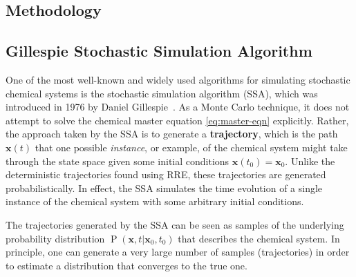 \documentclass[english,letterpaper,12pt]{report}
\newcommand{\defkeywd}[1]{\textbf{#1}}
\renewcommand{\vec}[1]{\ensuremath{\mathbf{#1}}}
\DeclareMathOperator{\Prob}{P}
\begin{document}
\begin{doublespacing}

\chapter{Methodology} %
\label{sec:methodology}

\section{Gillespie Stochastic Simulation Algorithm} %
\label{sub:gillespie-ssa}

One of the most well-known and widely used  algorithms for simulating stochastic chemical systems is the stochastic simulation algorithm (SSA), which was introduced in 1976 by Daniel Gillespie~\cite{gillespie-1976}. As a Monte Carlo technique, it does not attempt to solve the chemical master equation \eqref{eq:master-eqn} explicitly. Rather, the approach taken by the SSA is to generate a \defkeywd{trajectory}, which is the path $\vec{x}(t)$ that one possible \emph{instance}, or example, of the chemical system might take through the state space given some initial conditions $\vec{x}(t_0) = \vec{x}_0$. Unlike the deterministic trajectories found using RRE, these trajectories are generated probabilistically. In effect, the SSA simulates the time evolution of a single instance of the chemical system with some arbitrary initial conditions.

The trajectories generated by the SSA can be seen as samples of the underlying probability distribution $\Prob(\vec{x}, t | \vec{x}_0, t_0)$ that describes the chemical system. In principle, one can generate a very large number of samples (trajectories) in order to estimate a distribution that converges to the true one.


\end{doublespacing}
\end{document}

